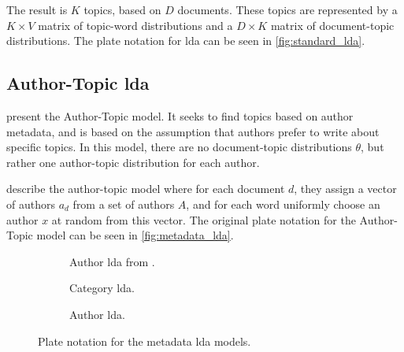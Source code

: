 The result is $K$ topics, based on $D$ documents.
These topics are represented by a $K \times V$ matrix of topic-word distributions and a $D \times K$ matrix of document-topic distributions.
The plate notation for \gls{lda} can be seen in \autoref{fig:standard_lda}.





\subsection{Author-Topic \gls{lda}}\label{subsec:auth_prelim} 
\citet{author_topic_2012} present the Author-Topic model.
It seeks to find topics based on author metadata, and is based on the assumption that authors prefer to write about specific topics.
In this model, there are no document-topic distributions $\theta$, but rather one author-topic distribution for each author.


\citet{author_topic_2012} describe the author-topic model where for each document $d$, they assign a vector of authors $a_d$ from a set of authors $A$, and for each word uniformly choose an author $x$ at random from this vector.
The original plate notation for the Author-Topic model can be seen in \autoref{fig:metadata_lda}.

\begin{figure*}[ht]
	\centering
	\begin{subfigure}{0.275\textwidth}
		\centering
		\resizebox{\textwidth}{!}{%
			
		}
		\caption{Author \gls{lda} from \cite{author_topic_2012}.}
		\label{fig:original_author_lda}
	\end{subfigure}
	\hspace{2em}
	\begin{subfigure}{0.275\textwidth}
		\centering
		\resizebox{\textwidth}{!}{%
			
		}
		\caption{Category \gls{lda}.}
		\label{fig:category_lda}
	\end{subfigure}
	\hspace{2em}
	\begin{subfigure}{0.275\textwidth}
		\centering
		\resizebox{\textwidth}{!}{%
			
		}
		\caption{Author \gls{lda}.}
		\label{fig:author_lda}
	\end{subfigure}	
	\caption{Plate notation for the metadata \gls{lda} models.}
	\label{fig:metadata_lda}
\end{figure*}

